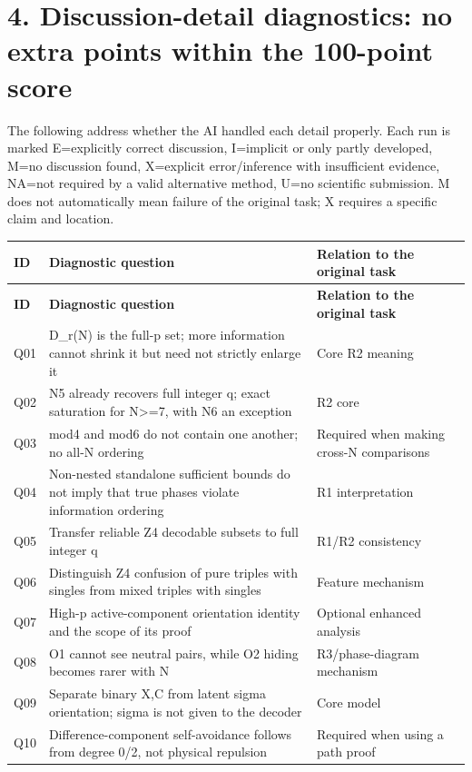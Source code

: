 \documentclass[11pt,a4paper]{article}
\begin{document}
\section*{4. Discussion-detail diagnostics: no extra points within the 100-point score}

The following address whether the AI handled each detail properly. Each run is marked E=explicitly correct discussion, I=implicit or only partly developed, M=no discussion found, X=explicit error/\allowbreak{}inference with insufficient evidence, NA=not required by a valid alternative method, U=no scientific submission. M does not automatically mean failure of the original task; X requires a specific claim and location.

{\fontsize{9}{12.5}\selectfont
\setlength{\tabcolsep}{2.2pt}

\begin{longtable}{>{\raggedright\arraybackslash}p{}>{\raggedright\arraybackslash}p{}>{\raggedright\arraybackslash}p{}}
\toprule
\textbf{ID} & \textbf{Diagnostic question} & \textbf{Relation to the original task}\tabularnewline
\midrule
\endfirsthead
\toprule
\textbf{ID} & \textbf{Diagnostic question} & \textbf{Relation to the original task}\tabularnewline
\midrule
\endhead
{}Q01 & D\_r(N) is the full-p set; more information cannot shrink it but need not strictly enlarge it & Core R2 meaning\tabularnewline
{}Q02 & N5 already recovers full integer q; exact saturation for N>=7, with N6 an exception & R2 core\tabularnewline
{}Q03 & mod4 and mod6 do not contain one another; no all-N ordering & Required when making cross-N comparisons\tabularnewline
{}Q04 & Non-nested standalone sufficient bounds do not imply that true phases violate information ordering & R1 interpretation\tabularnewline
{}Q05 & Transfer reliable Z4 decodable subsets to full integer q & R1/\allowbreak{}R2 consistency\tabularnewline
{}Q06 & Distinguish Z4 confusion of pure triples with singles from mixed triples with singles & Feature mechanism\tabularnewline
{}Q07 & High-p active-component orientation identity and the scope of its proof & Optional enhanced analysis\tabularnewline
{}Q08 & O1 cannot see neutral pairs, while O2 hiding becomes rarer with N & R3/\allowbreak{}phase-diagram mechanism\tabularnewline
{}Q09 & Separate binary X,C from latent sigma orientation; sigma is not given to the decoder & Core model\tabularnewline
{}Q10 & Difference-component self-avoidance follows from degree 0/\allowbreak{}2, not physical repulsion & Required when using a path proof\tabularnewline

\end{longtable}}
\end{document}
